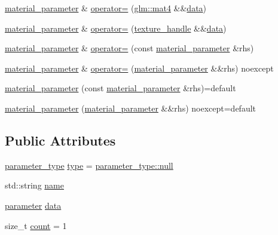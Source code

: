 \begin{DoxyCompactItemize}
\mbox{\hyperlink{structmoka_1_1material__parameter}{material\+\_\+parameter}} \& \mbox{\hyperlink{structmoka_1_1material__parameter_aeb08a393e475ee7f0a10b8da56c2d696}{operator=}} (\mbox{\hyperlink{namespacemoka_aed2224bc0e5b79e57a8975ded94ee1aaabe14b41eb96410ea28b32bc138d885ae}{glm\+::mat4}} \&\&\mbox{\hyperlink{structmoka_1_1material__parameter_a13f49bc49ae262cc75f8717869f769eb}{data}})
\item 
\mbox{\hyperlink{structmoka_1_1material__parameter}{material\+\_\+parameter}} \& \mbox{\hyperlink{structmoka_1_1material__parameter_a19098ad9690c708f30c2dda89bba99f3}{operator=}} (\mbox{\hyperlink{structmoka_1_1texture__handle}{texture\+\_\+handle}} \&\&\mbox{\hyperlink{structmoka_1_1material__parameter_a13f49bc49ae262cc75f8717869f769eb}{data}})
\item 
\mbox{\hyperlink{structmoka_1_1material__parameter}{material\+\_\+parameter}} \& \mbox{\hyperlink{structmoka_1_1material__parameter_a3ffbbae3a4eb694645010647117de3d8}{operator=}} (const \mbox{\hyperlink{structmoka_1_1material__parameter}{material\+\_\+parameter}} \&rhs)
\item 
\mbox{\hyperlink{structmoka_1_1material__parameter}{material\+\_\+parameter}} \& \mbox{\hyperlink{structmoka_1_1material__parameter_a0bf5fe8870459340e2c2c5bdec5fc588}{operator=}} (\mbox{\hyperlink{structmoka_1_1material__parameter}{material\+\_\+parameter}} \&\&rhs) noexcept
\item 
\mbox{\hyperlink{structmoka_1_1material__parameter_aefdabb59fb40999a1b5ec5d4eadec126}{material\+\_\+parameter}} (const \mbox{\hyperlink{structmoka_1_1material__parameter}{material\+\_\+parameter}} \&rhs)=default
\item 
\mbox{\hyperlink{structmoka_1_1material__parameter_a15faed252da4c4f69aaf358ea5b028d2}{material\+\_\+parameter}} (\mbox{\hyperlink{structmoka_1_1material__parameter}{material\+\_\+parameter}} \&\&rhs) noexcept=default
\end{DoxyCompactItemize}
\subsection*{Public Attributes}
\begin{DoxyCompactItemize}
\item 
\mbox{\hyperlink{namespacemoka_aed2224bc0e5b79e57a8975ded94ee1aa}{parameter\+\_\+type}} \mbox{\hyperlink{structmoka_1_1material__parameter_a4a9035370e7b6c97cf89275c712cbd9e}{type}} = \mbox{\hyperlink{namespacemoka_a6d27be7986842909ecfb039004d3f9e9a37a6259cc0c1dae299a7866489dff0bd}{parameter\+\_\+type\+::null}}
\item 
std\+::string \mbox{\hyperlink{structmoka_1_1material__parameter_a9bac68a3935142d56b14332f33b71dc2}{name}}
\item 
\mbox{\hyperlink{namespacemoka_afdb5f6e8afb209971d12dec045ec48ee}{parameter}} \mbox{\hyperlink{structmoka_1_1material__parameter_a13f49bc49ae262cc75f8717869f769eb}{data}}
\item 
size\+\_\+t \mbox{\hyperlink{structmoka_1_1material__parameter_ad55b26c96a233450607753c895440581}{count}} = 1
\end{DoxyCompactItemize}


